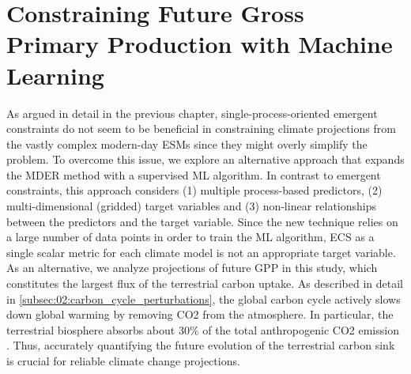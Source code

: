 


\chapter{Constraining Future Gross Primary Production with Machine Learning}
\label{ch:06:paper_gpp}

As argued in detail in the previous chapter, single-process-oriented emergent
constraints do not seem to be beneficial in constraining climate projections
from the vastly complex modern-day \acp{ESM} since they might overly simplify
the problem. To overcome this issue, we explore an alternative approach that
expands the \acf{MDER} method with a supervised \acf{ML} algorithm. In contrast
to emergent constraints, this approach considers (1) multiple process-based
predictors, (2) multi-dimensional (gridded) target variables and (3) non-linear
relationships between the predictors and the target variable. Since the new
technique relies on a large number of data points in order to train the \ac{ML}
algorithm, \ac{ECS} as a single scalar metric for each climate model is not an
appropriate target variable. As an alternative, we analyze projections of
future \acf{GPP} in this study, which constitutes the largest flux of the
terrestrial carbon uptake. As described in detail in
\cref{subsec:02:carbon_cycle_perturbations}, the global carbon cycle actively
slows down global warming by removing \ac{CO2} from the atmosphere. In
particular, the terrestrial biosphere absorbs about $30 \unit{\%}$ of the total
anthropogenic \ac{CO2} emission \autocite{Friedlingstein2020}. Thus, accurately
quantifying the future evolution of the terrestrial carbon sink is crucial for
reliable climate change projections.

